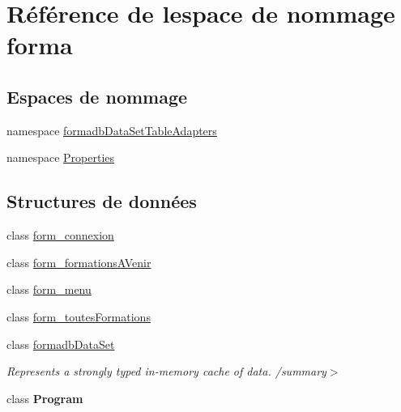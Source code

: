 \hypertarget{namespaceforma}{}\section{Référence de l\textquotesingle{}espace de nommage forma}
\label{namespaceforma}
\subsection*{Espaces de nommage}
\begin{DoxyCompactItemize}
\item 
namespace \hyperlink{namespaceforma_1_1formadb_data_set_table_adapters}{formadb\+Data\+Set\+Table\+Adapters}
\item 
namespace \hyperlink{namespaceforma_1_1_properties}{Properties}
\end{DoxyCompactItemize}
\subsection*{Structures de données}
\begin{DoxyCompactItemize}
\item 
class \hyperlink{classforma_1_1form__connexion}{form\+\_\+connexion}
\item 
class \hyperlink{classforma_1_1form__formations_a_venir}{form\+\_\+formations\+A\+Venir}
\item 
class \hyperlink{classforma_1_1form__menu}{form\+\_\+menu}
\item 
class \hyperlink{classforma_1_1form__toutes_formations}{form\+\_\+toutes\+Formations}
\item 
class \hyperlink{classforma_1_1formadb_data_set}{formadb\+Data\+Set}
\begin{DoxyCompactList}\small\item\em Represents a strongly typed in-\/memory cache of data. /summary$>$ \end{DoxyCompactList}\item 
class {\bfseries Program}
\end{DoxyCompactItemize}
